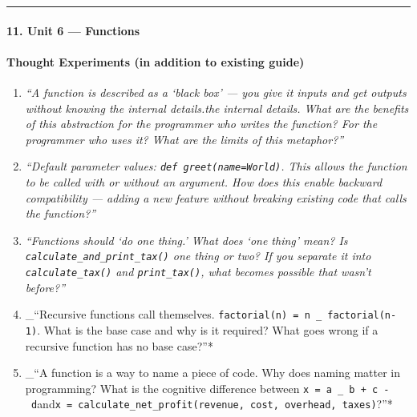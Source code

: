 \documentclass[
  justified,
  openright,
]{tufte-book}
\let\subsection\paragraph
\let\paragraph\paragraph
\let\subsection\paragraph
\let\paragraph\paragraph
\begin{document}
\begin{center}\rule{0.5\linewidth}{0.5pt}\end{center}

\subsection{11. Unit 6 --- Functions}\label{unit-6-functions}

\subsection{Thought Experiments (in addition to existing
guide)}\label{thought-experiments-in-addition-to-existing-guide}

\begin{enumerate}
\def\labelenumi{\arabic{enumi}.}
\item
  \emph{``A function is described as a `black box' --- you give it
  inputs and get outputs without knowing the internal details.the internal details.
What are
  the benefits of this abstraction for the programmer who writes the
  function? For the programmer who uses it? What are the limits of this
  metaphor?''}
\item
  \emph{``Default parameter values:
  \texttt{def\ greet(name=\textquotesingle{}World\textquotesingle{})}.
  This allows the function to be called with or without an argument. How
  does this enable backward compatibility --- adding a new feature
  without breaking existing code that calls the function?''}
\item
  \emph{``Functions should `do one thing.' What does `one thing' mean?
  Is \texttt{calculate\_and\_print\_tax()} one thing or two? If you
  separate it into \texttt{calculate\_tax()} and \texttt{print\_tax()},
  what becomes possible that wasn't before?''}
\item
  \_``Recursive functions call themselves.
  \texttt{factorial(n)\ =\ n\ \_\ factorial(n-1)}. What is the base case
  and why is it required? What goes wrong if a recursive function has no
  base case?''*
\item
  \_``A function is a way to name a piece of code. Why does naming
  matter in programming? What is the cognitive difference between
  \texttt{x\ =\ a\ \_\ b\ +\ c\ -\ d}and\texttt{x\ =\ calculate\_net\_profit(revenue,\ cost,\ overhead,\ taxes)}?''*
\end{enumerate}
\end{document}
